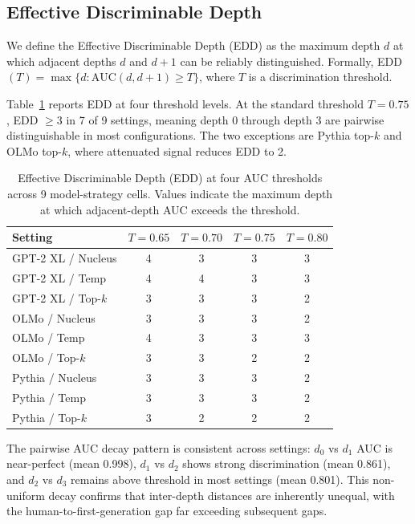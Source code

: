 \documentclass[11pt,a4paper]{article}
\begin{document}
\subsection{Effective Discriminable Depth}

We define the Effective Discriminable Depth (EDD) as the maximum depth $d$ at which adjacent depths $d$ and $d{+}1$ can be reliably distinguished. Formally, EDD$(T) = \max\{d : \text{AUC}(d, d{+}1) \geq T\}$, where $T$ is a discrimination threshold.

Table~\ref{tab:edd} reports EDD at four threshold levels. At the standard threshold $T{=}0.75$, EDD $\geq 3$ in 7 of 9 settings, meaning depth 0 through depth 3 are pairwise distinguishable in most configurations. The two exceptions are Pythia top-$k$ and OLMo top-$k$, where attenuated signal reduces EDD to 2.

\begin{table}[t]
\centering
\caption{Effective Discriminable Depth (EDD) at four AUC thresholds across 9 model-strategy cells. Values indicate the maximum depth at which adjacent-depth AUC exceeds the threshold.}
\label{tab:edd}
\small
\begin{tabular}{lcccc}
\toprule
\textbf{Setting} & $T{=}0.65$ & $T{=}0.70$ & $T{=}0.75$ & $T{=}0.80$ \\
\midrule
GPT-2 XL / Nucleus   & 4 & 3 & 3 & 3 \\
GPT-2 XL / Temp      & 4 & 4 & 3 & 3 \\
GPT-2 XL / Top-$k$   & 3 & 3 & 3 & 2 \\
OLMo / Nucleus        & 3 & 3 & 3 & 2 \\
OLMo / Temp           & 4 & 3 & 3 & 3 \\
OLMo / Top-$k$        & 3 & 3 & 2 & 2 \\
Pythia / Nucleus       & 3 & 3 & 3 & 2 \\
Pythia / Temp          & 3 & 3 & 3 & 2 \\
Pythia / Top-$k$       & 3 & 2 & 2 & 2 \\
\bottomrule
\end{tabular}
\end{table}

The pairwise AUC decay pattern is consistent across settings: $d_0$ vs $d_1$ AUC is near-perfect (mean 0.998), $d_1$ vs $d_2$ shows strong discrimination (mean 0.861), and $d_2$ vs $d_3$ remains above threshold in most settings (mean 0.801). This non-uniform decay confirms that inter-depth distances are inherently unequal, with the human-to-first-generation gap far exceeding subsequent gaps.
\end{document}
